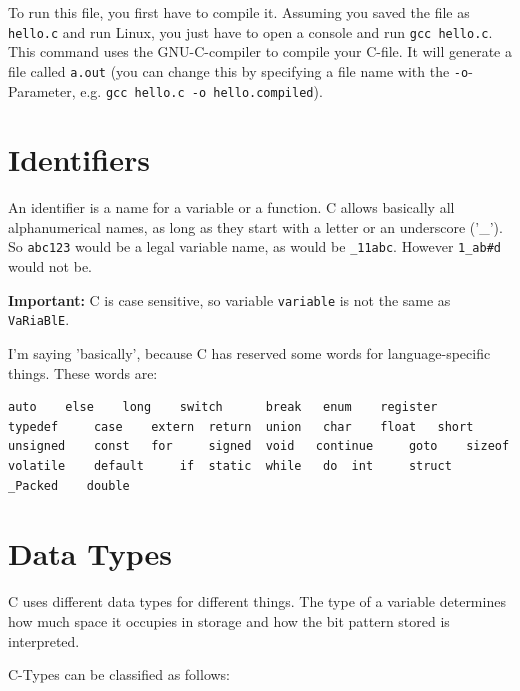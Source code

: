 \documentclass[a4paper, 11pt]{article}
\newcommand{\code}[1]{\texttt{#1}}
\begin{document}
To run this file, you first have to compile it. Assuming you saved the file as \code{hello.c} and run Linux, you just have to open a console and run \code{gcc hello.c}. This command uses the GNU-C-compiler to compile your C-file. It will generate a file called \code{a.out} (you can change this by specifying a file name with the \code{-o}-Parameter, e.g. \code{gcc hello.c -o hello.compiled}).

\section{Identifiers}
An identifier is a name for a variable or a function. C allows basically all alphanumerical names, as long as they start with a letter or an underscore ('\_'). So \code{abc123} would be a legal variable name, as would be \code{\_11abc}. However \code{1\_ab\#d} would not be. 

\vspace{10px}


\textbf{Important:} C is case sensitive, so variable \code{variable} is not the same as \code{VaRiaBlE}.

\vspace{10px}

I'm saying 'basically', because C has reserved some words for language-specific things. These words are:

\begin{lstlisting}
auto 	else 	long 	switch      break 	enum 	register 	typedef     case 	extern 	return 	union   char 	float 	short 	unsigned    const 	for 	signed 	void   continue 	goto 	sizeof 	volatile    default 	if 	static 	while   do 	int 	struct 	_Packed    double
\end{lstlisting}

\newpage

\section{Data Types}
C uses different data types for different things. The type of a variable determines how much space it occupies in storage and how the bit pattern stored is interpreted.

C-Types can be classified as follows:
\end{document}

